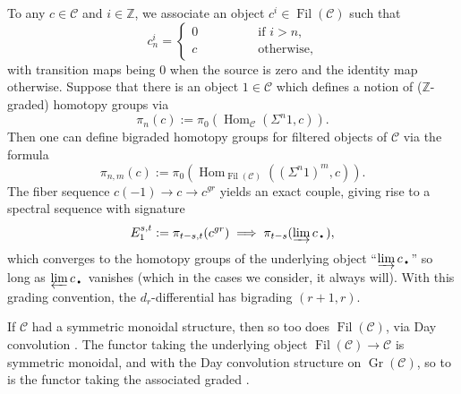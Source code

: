 \documentclass[11pt,leqno]{article}
\newcommand{\zz}{\mathbb{Z}}
\newcommand{\mc}[1]{\mathcal{#1}}
\DeclareMathOperator{\Hom}{Hom}
\newcommand{\mo}[1]{\operatorname{#1}}
\newcommand{\bdot}{\text{\textbullet}}
\newtheorem*{short hand}{theorem name}
\theoremstyle{plain}  %
\theoremstyle{definition}
\numberwithin{equation}{section}
\begin{document}
To any $c\in \mc{C}$ and $i\in\zz$, we associate an object $c^{i}\in \mo{Fil}(\mc{C})$ such that $$c^i_{n}=\begin{cases}
	0 & \qquad \qquad \text{if } i>n,\\
	c & \qquad \qquad \text{otherwise},
\end{cases}$$ with transition maps being 0 when the source is zero and the identity map otherwise.  Suppose that there is an object $1\in\mc{C}$ which defines a notion of ($\zz$-graded) homotopy groups via $$\pi_n(c):=\pi_0(\Hom_{\mc{C}}(\Sigma^{n}1,c)).$$  Then one can define bigraded homotopy groups for filtered objects of $\mc{C}$ via the formula $$\pi_{n,m}(c):=\pi_0(\Hom_{\mo{Fil}(\mc{C})}((\Sigma^n1)^m,c)).$$
The fiber sequence $c(-1)\to c \to c^{gr}$ yields an exact couple, giving rise to a spectral sequence with signature $$E_1^{s,t}:=\pi_{t-s,t}(c^{gr})\implies \pi_{t-s}(\varinjlim c_{\bdot}),$$ which converges to the homotopy groups of the underlying object ``$\varinjlim c_{\bdot}$'' so long as $\varprojlim c_{\bdot}$ vanishes (which in the cases we consider, it always will).  With this grading convention, the $d_r$-differential has bigrading $(r+1,r)$.

If $\mc{C}$ had a symmetric monoidal structure, then so too does $\mo{Fil}(\mc{C})$, via Day convolution \cite[~]{HA}.  The functor taking the underlying object $\mo{Fil}(\mc{C})\to \mc{C}$ is symmetric monoidal, and with the Day convolution structure on $\mo{Gr}(\mc{C})$, so to is the functor taking the associated graded \cite[~\textsection Appendix B]{burklund2022galois}.
\end{document}
